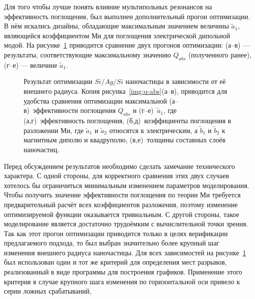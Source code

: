 Для того чтобы лучше понять влияние мультипольных резонансов на
эффективность поглощения, был выполнен дополнительный прогон
оптимизации. В нём искались дизайны, обладающие максимальным значением
величины $\tilde{a}_1$, являющейся коэффициентом Ми для поглощения
электрической дипольной модой. На рисунке~\ref{img:q-abs-a1}
приводится сравнение двух прогонов оптимизации: (а--в) --- результаты,
соответствующие максимальному значению $Q_{abs}$ (полученного ранее),
(г--е) --- величине $\tilde{a}_1$.
\begin{figure}[t]
  \begin{minipage}[ht]{0.495\linewidth}
  \end{minipage}
  \hfill
  \begin{minipage}[ht]{0.495\linewidth}
  \end{minipage}
  \caption{ Результат оптимизации $Si/Ag/Si$ наночастицы в
    зависимости от её внешнего радиуса.  Копия
    рисунка~\ref{img:q-abs}(а--в), приводится для удобства сравнения
    оптимизации максимальной (а--в)~эффективности поглощения $Q_{abs}$
    и (г--е)~$\tilde{a}_1$, где (а,г)~эффективность
    поглощения, (б,д)~коэффициенты поглощения в разложении Ми, где
    $\tilde{a}_1$ и $\tilde{a}_2$ относятся к электрическим, а
    $\tilde{b}_1$ и $\tilde{b}_2$ к магнитным диполю и квадруполю,
    (в,е)~толщины составных слоёв наночастиц.}
  \label{img:q-abs-a1}
\end{figure}
Перед обсуждением результатов необходимо сделать замечание
технического характера.  С одной стороны, для корректного сравнения
этих двух случаев хотелось бы ограничиться минимальным изменением
параметров моделирования.  Чтобы получить значение эффективности поглощения
по теории Ми требуется предварительный расчёт всех коэффициентов
разложения, поэтому изменение оптимизируемой функции оказывается
тривиальным.  С другой стороны, такое моделирование является
достаточно трудоёмким с вычислительной точки зрения.  Так как этот
прогон оптимизации приводится только в целях верификации предлагаемого
подхода, то был выбран значительно более крупный шаг изменения
внешнего радиуса наночастицы.  Для всех зависимостей на
рисунке~\ref{img:q-abs-a1} был использован один и тот же критерий для
определения мест разрывов, реализованный в виде программы для
построения графиков.  Применение этого критерия в случае крупного шага
изменения по горизонтальной оси привело к серии ложных срабатываний,
